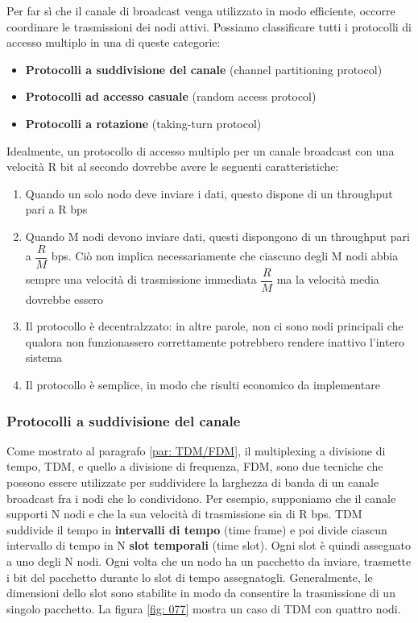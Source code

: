 \documentclass[11pt,a4paper]{article}
\begin{document}
Per far sì che il canale di broadcast venga utilizzato in modo efficiente, occorre coordinare le trasmissioni dei nodi attivi. Possiamo classificare tutti i protocolli di accesso multiplo in una di queste categorie:
\begin{itemize}
	\item \textbf{Protocolli a suddivisione del canale} (channel partitioning protocol)
	\item \textbf{Protocolli ad accesso casuale} (random access protocol)
	\item \textbf{Protocolli a rotazione }(taking-turn protocol)
\end{itemize}
Idealmente, un protocollo di accesso multiplo per un canale broadcast con una velocità R bit al secondo dovrebbe avere le seguenti caratteristiche:
\begin{enumerate}
	\item Quando un solo nodo deve inviare i dati, questo dispone di un throughput pari a R bps
	\item Quando M nodi devono inviare dati, questi dispongono di un throughput pari a $\dfrac{R}{M}$ bps. Ciò non implica necessariamente che ciascuno degli M nodi abbia sempre una velocità di trasmissione immediata $\dfrac{R}{M}$ ma la velocità media dovrebbe essero
	\item Il protocollo è decentralzzato: in altre parole, non ci sono nodi principali che qualora non funzionassero correttamente potrebbero rendere inattivo l'intero sistema
	\item Il protocollo è semplice, in modo che risulti economico da implementare
\end{enumerate}

\subsubsection{Protocolli a suddivisione del canale}
Come mostrato al paragrafo \ref{par: TDM/FDM}, il multiplexing a divisione di tempo, TDM, e quello a divisione di frequenza, FDM, sono due tecniche che possono essere utilizzate per suddividere la larghezza di banda di un canale broadcast fra i nodi che lo condividono. Per esempio, supponiamo che il canale supporti N nodi e che la sua velocità di trasmissione sia di R bps. TDM suddivide il tempo in \textbf{intervalli di tempo} (time frame) e poi divide ciascun intervallo di tempo in N \textbf{slot temporali} (time slot). Ogni slot è quindi assegnato a uno degli N nodi. Ogni volta che un nodo ha un pacchetto da inviare, trasmette i bit del pacchetto durante lo slot di tempo assegnatogli. Generalmente, le dimensioni dello slot sono stabilite in modo da consentire la trasmissione di un singolo pacchetto. La figura \ref{fig: 077} mostra un caso di TDM con quattro nodi.
\end{document}
